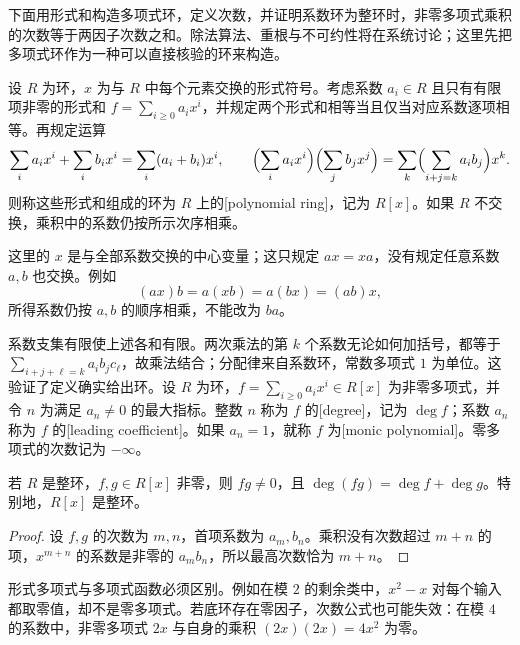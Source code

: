 \ProseParagraphBreak
下面用形式和构造多项式环，定义次数，并证明系数环为整环时，非零多项式乘积的次数等于两因子次数之和。除法算法、重根与不可约性将在系统讨论；这里先把多项式环作为一种可以直接核验的环来构造。

\begin{definition}\label{b1:def:polynomial-ring}
	设 \(R\) 为环，\(x\) 为与 \(R\) 中每个元素交换的形式符号。考虑系数 \(a_i\in R\) 且只有有限项非零的形式和 \(f=\sum_{i\geq0}a_ix^i\)，并规定两个形式和相等当且仅当对应系数逐项相等。再规定运算
	\[
		\sum_i a_ix^i+\sum_i b_ix^i=\sum_i(a_i+b_i)x^i, \qquad \Bigl(\sum_i a_ix^i\Bigr)\Bigl(\sum_j b_jx^j\Bigr) =\sum_k\Bigl(\sum_{i+j=k}a_ib_j\Bigr)x^k.
	\]
	则称这些形式和组成的环为 \(R\) 上的[polynomial ring]，记为 \(R[x]\)。如果 \(R\) 不交换，乘积中的系数仍按所示次序相乘。
\end{definition}
这里的 \(x\) 是与全部系数交换的中心变量；这只规定 \(ax=xa\)，没有规定任意系数 \(a,b\) 也交换。例如
\[
	(ax)b=a(xb)=a(bx)=(ab)x,
\]
所得系数仍按 \(a,b\) 的顺序相乘，不能改为 \(ba\)。

\ProseParagraphBreak
系数支集有限使上述各和有限。两次乘法的第 \(k\) 个系数无论如何加括号，都等于 \(\sum_{i+j+\ell=k}a_ib_jc_\ell\)，故乘法结合；分配律来自系数环，常数多项式 \(1\) 为单位。这验证了定义确实给出环。设 \(R\) 为环，\(f=\sum_{i\geq0}a_ix^i\in R[x]\) 为非零多项式，并令 \(n\) 为满足 \(a_n\ne0\) 的最大指标。整数 \(n\) 称为 \(f\) 的[degree]，记为 \(\deg f\)；系数 \(a_n\) 称为 \(f\) 的[leading coefficient]。如果 \(a_n=1\)，就称 \(f\) 为[monic polynomial]。零多项式的次数记为 \(-\infty\)。

\begin{proposition}\label{b1:prop:polynomial-degree}
	若 \(R\) 是整环，\(f,g\in R[x]\) 非零，则 \(fg\ne0\)，且 \(\deg(fg)=\deg f+\deg g\)。特别地，\(R[x]\) 是整环。
\end{proposition}
\begin{proof}
	设 \(f,g\) 的次数为 \(m,n\)，首项系数为 \(a_m,b_n\)。乘积没有次数超过 \(m+n\) 的项，\(x^{m+n}\) 的系数是非零的 \(a_mb_n\)，所以最高次数恰为 \(m+n\)。
\end{proof}
形式多项式与多项式函数必须区别。例如在模 \(2\) 的剩余类中，\(x^2-x\) 对每个输入都取零值，却不是零多项式。若底环存在零因子，次数公式也可能失效：在模 \(4\) 的系数中，非零多项式 \(2x\) 与自身的乘积 \((2x)(2x)=4x^2\) 为零。

